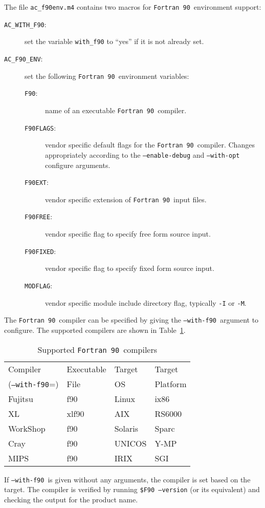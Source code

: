 \documentclass[11pt]{nmemo}
\newcommand{\fninety}{\texttt{Fortran~90}}
\newcommand{\withfninety}{\texttt{--with-f90}}
\newcommand{\fninetyenv}{\texttt{AC\_F90\_ENV}}
\begin{document}
The file \texttt{ac\_f90env.m4} contains two macros for \fninety\
environment support:
\begin{description}
\item[\texttt{AC\_WITH\_F90}:] set the variable \texttt{with\_f90} to
``yes'' if it is not already set.
\item[\fninetyenv:] set the following \fninety\ environment variables:
\begin{description}
\item[\texttt{F90}:] name of an executable \fninety\ compiler.
\item[\texttt{F90FLAGS}:] vendor specific default flags for the
\fninety\ compiler.  Changes appropriately according to the
\texttt{--enable-debug} and \texttt{--with-opt} configure arguments.
\item[\texttt{F90EXT}:] vendor specific extension of \fninety\ input files.
\item[\texttt{F90FREE}:] vendor specific flag to specify free form
source input. 
\item[\texttt{F90FIXED}:] vendor specific flag to specify fixed form
source input. 
\item[\texttt{MODFLAG}:] vendor specific module include directory
flag, typically \texttt{-I} or \texttt{-M}.
\end{description}
\end{description}

The \fninety\ compiler can be specified by giving the \withfninety\ 
argument to configure.  The supported compilers are shown in
Table~\ref{tbl:compilers}.
\begin{table}[htb]
\hrulefill
\begin{center}
\caption{Supported \fninety\ compilers}\label{tbl:compilers}
\begin{tabular}{l|l|l|l}
Compiler        & Executable & Target  & Target \\
(\withfninety=) & File       & OS      & Platform \\ \hline
Fujitsu         & f90        & Linux   & ix86 \\
XL	        & xlf90      & AIX     & RS6000 \\
WorkShop        & f90	     & Solaris & Sparc \\
Cray            & f90        & UNICOS  & Y-MP \\
MIPS            & f90        & IRIX    & SGI  
\end{tabular}
\end{center}
\hrulefill
\end{table}
If \withfninety\ is given without any arguments, the compiler is set
based on the target.  The compiler is verified by running
\texttt{\$F90 --version} (or its equivalent) and checking the output
for the product name.
\end{document}
